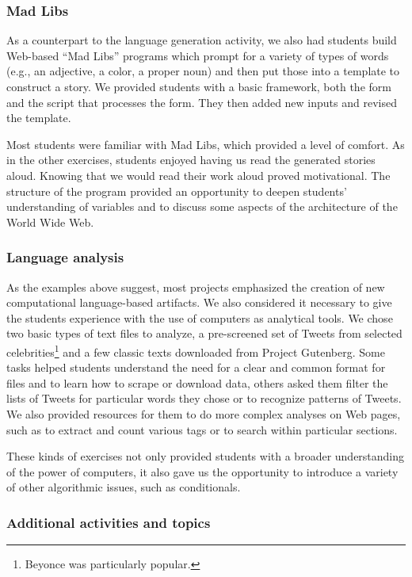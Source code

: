 \subsubsection{Mad Libs}

As a counterpart to the language generation activity, we also had students
build Web-based ``Mad Libs'' programs which prompt for a variety of types
of words (e.g., an adjective, a color, a proper noun) and then put those
into a template to construct a story.  We provided students with a basic
framework, both the form and the script that processes the form.  They
then added new inputs and revised the template.

Most students were familiar with Mad Libs, which provided a level
of comfort. As in the other exercises, students enjoyed having us
read the generated stories aloud.  Knowing that we would read their
work aloud proved motivational.  The structure of the program
provided an opportunity to deepen students' understanding of variables
and to discuss some aspects of the architecture of the World Wide
Web.

\subsubsection{Language analysis}

As the examples above suggest, most projects emphasized the creation
of new computational language-based artifacts.  We also considered
it necessary to give the students experience with the use of computers
as analytical tools.  We chose two basic types of text files to
analyze, a pre-screened set of Tweets from selected
celebrities\footnote{Beyonce was particularly popular.} and a few
classic texts downloaded from Project Gutenberg.  Some tasks helped
students understand the need for a clear and common format for
files and to learn how to scrape or download data, others asked
them filter the lists of Tweets for particular words they chose or
to recognize patterns of Tweets.  We also provided resources for
them to do more complex analyses on Web pages, such as to extract
and count various tags or to search within particular sections.

These kinds of exercises not only provided students with a broader 
understanding of the power of computers, it also gave us the opportunity
to introduce a variety of other algorithmic issues, such as conditionals.

\subsubsection{Additional activities and topics}

